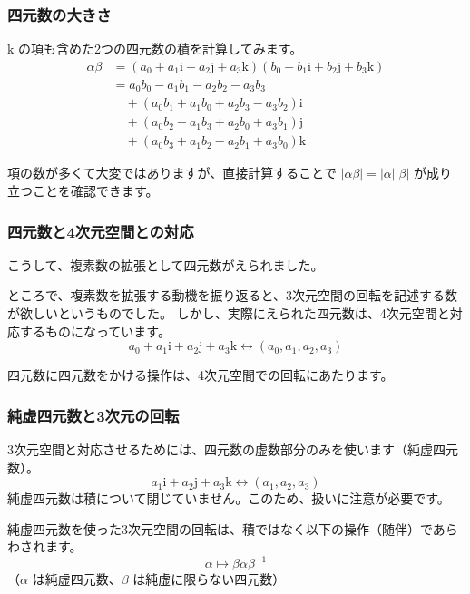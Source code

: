 \documentclass{beamer}
\newcommand{\ii}{\mathrm{i}}
\newcommand{\jj}{\mathrm{j}}
\newcommand{\kk}{\mathrm{k}}
\begin{document}
\begin{frame}
    \frametitle{四元数の大きさ}

    \(\kk\) の項も含めた2つの四元数の積を計算してみます。
    \begin{align*}
        \alpha \beta & = (a_0 + a_1 \ii + a_2 \jj + a_3 \kk) (b_0 + b_1 \ii + b_2 \jj + b_3 \kk) \\
                     & = a_0 b_0 - a_1 b_1 - a_2 b_2 - a_3 b_3                                   \\
                     & \quad + (a_0 b_1 + a_1 b_0 + a_2 b_3 - a_3 b_2) \ii                       \\
                     & \quad + (a_0 b_2 - a_1 b_3 + a_2 b_0 + a_3 b_1) \jj                       \\
                     & \quad + (a_0 b_3 + a_1 b_2 - a_2 b_1 + a_3 b_0) \kk
    \end{align*}

    \bigskip

    項の数が多くて大変ではありますが、直接計算することで \(|\alpha \beta| = |\alpha| |\beta|\) が成り立つことを確認できます。
\end{frame}

\begin{frame}
    \frametitle{四元数と4次元空間との対応}

    こうして、複素数の拡張として四元数がえられました。

    \bigskip

    ところで、複素数を拡張する動機を振り返ると、3次元空間の回転を記述する数が欲しいというものでした。
    しかし、実際にえられた四元数は、4次元空間と対応するものになっています。
    \[
        a_0 + a_1 \ii + a_2 \jj + a_3 \kk \longleftrightarrow (a_0, a_1, a_2, a_3)
    \]

    四元数に四元数をかける操作は、4次元空間での回転にあたります。
\end{frame}

\begin{frame}
    \frametitle{純虚四元数と3次元の回転}

    3次元空間と対応させるためには、四元数の虚数部分のみを使います（純虚四元数）。
    \[
        a_1 \ii + a_2 \jj + a_3 \kk \longleftrightarrow (a_1, a_2, a_3)
    \]
    純虚四元数は積について閉じていません。このため、扱いに注意が必要です。

    \bigskip

    純虚四元数を使った3次元空間の回転は、積ではなく以下の操作（随伴）であらわされます。
    \[
        \alpha \mapsto \beta \alpha \beta^{-1}
    \]
    （\(\alpha\) は純虚四元数、\(\beta\) は純虚に限らない四元数）
\end{frame}
\end{document}
